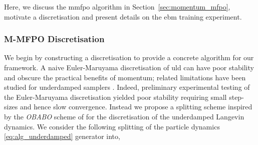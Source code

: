 Here, we discuss the \gls*{mmfpo} algorithm in Section~\ref{sec:momentum_mfpo}, motivate a discretisation  and present details on the \gls*{ebm} training experiment.

\subsubsection{\textsc{\small M-MFPO} Discretisation}

We begin by constructing a discretisation to provide a concrete algorithm for our framework. A naive Euler-Maruyama discretisation of \gls*{uld} can have poor stability and obscure the practical benefits of momentum; related limitations have been studied for underdamped samplers \citep{em_bad1_ma2019analognesterovaccelerationmcmc}. Indeed, preliminary experimental testing of the Euler-Maruyama discretisation yielded poor stability requiring small step-sizes and hence slow convergence. Instead we propose a splitting scheme inspired by the \textit{OBABO} scheme of \cite{obabo_ref_leimkuhler_matthews} for the discretisation of the underdamped Langevin dynamics. We consider the following splitting of the particle dynamics \eqref{eq:alg_underdamped} generator into,
